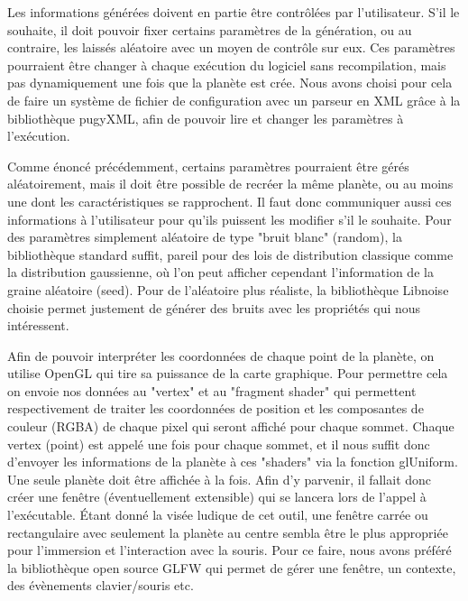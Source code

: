 \documentclass[a4paper]{article}
\begin{document}
\label{besoin_paramètres}
Les informations générées doivent en partie être contrôlées par l'utilisateur. S'il le souhaite, il doit pouvoir fixer certains paramètres de la génération, ou au contraire, les laissés aléatoire avec un moyen de contrôle sur eux. Ces paramètres pourraient être changer à chaque exécution du logiciel sans recompilation, mais pas dynamiquement une fois que la planète est crée. Nous avons choisi pour cela de faire un système de fichier de configuration avec un parseur en XML grâce à la bibliothèque pugyXML, afin de pouvoir lire et changer les paramètres à l'exécution.

\label{besoin_aleatory}
Comme énoncé précédemment, certains paramètres pourraient être gérés aléatoirement, mais il doit être possible de recréer la même planète, ou au moins une dont les caractéristiques se rapprochent.
Il faut donc communiquer aussi ces informations à l'utilisateur pour qu'ils puissent les modifier s'il le souhaite. 
Pour des paramètres simplement aléatoire de type "bruit blanc" (random), la bibliothèque standard suffit, pareil pour des lois de distribution classique comme la distribution gaussienne, où l'on peut afficher cependant l'information de la graine aléatoire (seed). Pour de l'aléatoire plus réaliste, la bibliothèque Libnoise choisie permet justement de générer des bruits avec les propriétés qui nous intéressent.


Afin de pouvoir interpréter les coordonnées de chaque point de la planète, on utilise OpenGL qui tire sa puissance de la carte graphique. Pour permettre cela on envoie nos données au "vertex" et au "fragment shader" qui permettent respectivement de traiter les coordonnées de position et les composantes de couleur (RGBA) de chaque pixel qui seront affiché pour chaque sommet. Chaque vertex (point) est appelé une fois pour chaque sommet, et il nous suffit donc d'envoyer les informations de la planète à ces "shaders" via la fonction glUniform.\cite{BookShader}
Une seule planète doit être affichée à la fois. Afin d’y parvenir, il fallait donc créer une fenêtre (éventuellement extensible) qui se lancera lors de l’appel à l’exécutable. Étant donné la visée ludique de cet outil, une fenêtre carrée ou rectangulaire avec seulement la planète au centre sembla être le plus appropriée pour l’immersion et l’interaction avec la souris. Pour ce faire, nous avons préféré la bibliothèque open source GLFW qui permet de gérer une fenêtre, un contexte, des évènements clavier/souris etc.
\end{document}
